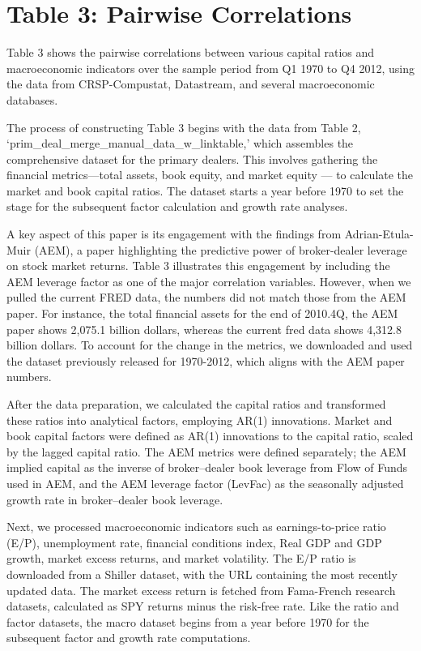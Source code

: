 \section*{Table 3: Pairwise Correlations}

Table 3 shows the pairwise correlations between various capital ratios and macroeconomic indicators over the sample period from Q1 1970 to Q4 2012, using the data from CRSP-Compustat, Datastream, and several macroeconomic databases.

The process of constructing Table 3 begins with the data from Table 2, `prim\_deal\_merge\_manual\_data\_w\_linktable,' which assembles the comprehensive dataset for the primary dealers. This involves gathering the financial metrics—total assets, book equity, and market equity — to calculate the market and book capital ratios.  The dataset starts a year before 1970 to set the stage for the subsequent factor calculation and growth rate analyses.

A key aspect of this paper is its engagement with the findings from Adrian-Etula-Muir (AEM), a paper highlighting the predictive power of broker-dealer leverage on stock market returns. Table 3 illustrates this engagement by including the AEM leverage factor as one of the major correlation variables. However, when we pulled the current FRED data, the numbers did not match those from the AEM paper. For instance, the total financial assets for the end of 2010.4Q, the AEM paper shows 2,075.1 billion dollars, whereas the current fred data shows 4,312.8 billion dollars. To account for the change in the metrics, we downloaded and used the dataset previously released for 1970-2012, which aligns with the AEM paper numbers.

After the data preparation, we calculated the capital ratios and transformed these ratios into analytical factors, employing AR(1) innovations. Market and book capital factors were defined as AR(1) innovations to the capital ratio, scaled by the lagged capital ratio. The AEM metrics were defined separately; the AEM implied capital as the inverse of broker–dealer book leverage from Flow of Funds used in AEM, and the AEM leverage factor (LevFac) as the seasonally adjusted growth rate in broker–dealer book leverage.

Next, we processed macroeconomic indicators such as earnings-to-price ratio (E/P), unemployment rate, financial conditions index, Real GDP and GDP growth, market excess returns, and market volatility. The E/P ratio is downloaded from a Shiller dataset, with the URL containing the most recently updated data. The market excess return is fetched from Fama-French research datasets, calculated as SPY returns minus the risk-free rate. Like the ratio and factor datasets, the macro dataset begins from a year before 1970 for the subsequent factor and growth rate computations.

